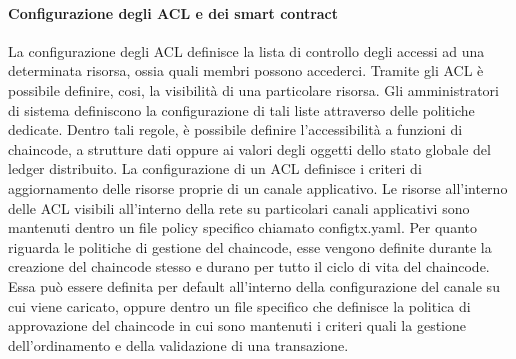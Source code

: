 \paragraph{Configurazione degli ACL e dei smart contract}
La configurazione degli ACL definisce la lista di controllo degli accessi ad una determinata risorsa, ossia quali membri possono accederci. Tramite gli ACL è possibile definire, cosi, la visibilità di una particolare risorsa. Gli amministratori di sistema definiscono la configurazione di tali liste attraverso delle politiche dedicate. Dentro tali regole, è possibile definire l'accessibilità a funzioni di chaincode, a strutture dati oppure ai valori degli oggetti dello stato globale del ledger distribuito. La configurazione di un ACL definisce i criteri di aggiornamento delle risorse proprie di un canale applicativo. Le risorse all'interno delle ACL visibili all'interno della rete su particolari canali applicativi sono mantenuti dentro un file policy specifico chiamato configtx.yaml.
Per quanto riguarda le politiche di gestione del chaincode, esse vengono definite durante la creazione del chaincode stesso e durano per tutto il ciclo di vita del chaincode. Essa può essere definita per default all'interno della configurazione del canale su cui viene caricato, oppure dentro un file specifico che definisce la politica di approvazione del chaincode in cui sono mantenuti i criteri quali la gestione dell'ordinamento e della validazione di una transazione.
\newpage
